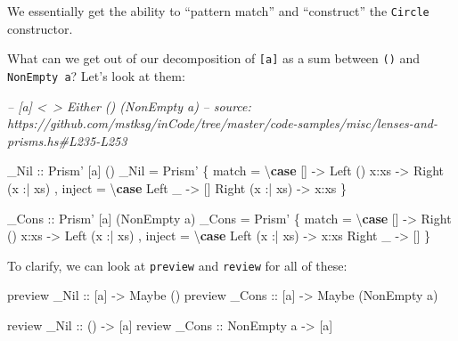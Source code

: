 \documentclass[]{article}
\newenvironment{Shaded}{}{}
\newcommand{\CommentTok}[1]{\textcolor[rgb]{0.38,0.63,0.69}{\textit{#1}}}
\newcommand{\DataTypeTok}[1]{\textcolor[rgb]{0.56,0.13,0.00}{#1}}
\newcommand{\FunctionTok}[1]{\textcolor[rgb]{0.02,0.16,0.49}{#1}}
\newcommand{\KeywordTok}[1]{\textcolor[rgb]{0.00,0.44,0.13}{\textbf{#1}}}
\newcommand{\NormalTok}[1]{#1}
\newcommand{\OtherTok}[1]{\textcolor[rgb]{0.00,0.44,0.13}{#1}}
\begin{document}
We essentially get the ability to ``pattern match'' and ``construct'' the
\texttt{Circle} constructor.

What can we get out of our decomposition of \texttt{{[}a{]}} as a sum between
\texttt{()} and \texttt{NonEmpty\ a}? Let's look at them:

\begin{Shaded}
\begin{Highlighting}[]
\CommentTok{-- [a] <~> Either () (NonEmpty a)}
\CommentTok{-- source: https://github.com/mstksg/inCode/tree/master/code-samples/misc/lenses-and-prisms.hs#L235-L253}

\OtherTok{_Nil ::} \DataTypeTok{Prism'}\NormalTok{ [a] ()}
\NormalTok{_Nil }\FunctionTok{=} \DataTypeTok{Prism'}
\NormalTok{    \{ match  }\FunctionTok{=}\NormalTok{ \textbackslash{}}\KeywordTok{case}
\NormalTok{        []              }\OtherTok{->} \DataTypeTok{Left}\NormalTok{ ()}
\NormalTok{        x}\FunctionTok{:}\NormalTok{xs            }\OtherTok{->} \DataTypeTok{Right}\NormalTok{ (x }\FunctionTok{:|}\NormalTok{ xs)}
\NormalTok{    , inject }\FunctionTok{=}\NormalTok{ \textbackslash{}}\KeywordTok{case}
        \DataTypeTok{Left}\NormalTok{ _          }\OtherTok{->}\NormalTok{ []}
        \DataTypeTok{Right}\NormalTok{ (x }\FunctionTok{:|}\NormalTok{ xs) }\OtherTok{->}\NormalTok{ x}\FunctionTok{:}\NormalTok{xs}
\NormalTok{    \}}

\OtherTok{_Cons ::} \DataTypeTok{Prism'}\NormalTok{ [a] (}\DataTypeTok{NonEmpty}\NormalTok{ a)}
\NormalTok{_Cons }\FunctionTok{=} \DataTypeTok{Prism'}
\NormalTok{    \{ match  }\FunctionTok{=}\NormalTok{ \textbackslash{}}\KeywordTok{case}
\NormalTok{        []              }\OtherTok{->} \DataTypeTok{Right}\NormalTok{ ()}
\NormalTok{        x}\FunctionTok{:}\NormalTok{xs            }\OtherTok{->} \DataTypeTok{Left}\NormalTok{ (x }\FunctionTok{:|}\NormalTok{ xs)}
\NormalTok{    , inject }\FunctionTok{=}\NormalTok{ \textbackslash{}}\KeywordTok{case}
        \DataTypeTok{Left}\NormalTok{  (x }\FunctionTok{:|}\NormalTok{ xs) }\OtherTok{->}\NormalTok{ x}\FunctionTok{:}\NormalTok{xs}
        \DataTypeTok{Right}\NormalTok{ _         }\OtherTok{->}\NormalTok{ []}
\NormalTok{    \}}
\end{Highlighting}
\end{Shaded}

To clarify, we can look at \texttt{preview} and \texttt{review} for all of
these:

\begin{Shaded}
\begin{Highlighting}[]
\NormalTok{preview}\OtherTok{ _Nil  ::}\NormalTok{ [a] }\OtherTok{->} \DataTypeTok{Maybe}\NormalTok{ ()}
\NormalTok{preview}\OtherTok{ _Cons ::}\NormalTok{ [a] }\OtherTok{->} \DataTypeTok{Maybe}\NormalTok{ (}\DataTypeTok{NonEmpty}\NormalTok{ a)}

\NormalTok{review}\OtherTok{  _Nil  ::}\NormalTok{ ()         }\OtherTok{->}\NormalTok{ [a]}
\NormalTok{review}\OtherTok{  _Cons ::} \DataTypeTok{NonEmpty}\NormalTok{ a }\OtherTok{->}\NormalTok{ [a]}
\end{Highlighting}
\end{Shaded}
\end{document}
